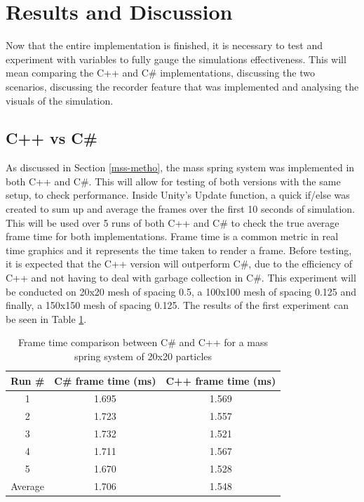 \documentclass[12pt,a4paper]{article}
\begin{document}
\section{Results and Discussion}
Now that the entire implementation is finished, it is necessary to test and experiment with variables to fully gauge the simulations effectiveness. This will mean comparing the C++ and C\# implementations, discussing the two scenarios, discussing the recorder feature that was implemented and analysing the visuals of the simulation.
\subsection{C++ vs C\#}
\label{cppcomp}
As discussed in Section \ref{mss-metho}, the mass spring system was implemented in both C++ and C\#. This will allow for testing of both versions with the same setup, to check performance. Inside Unity's Update function, a quick if/else was created to sum up and average the frames over the first 10 seconds of simulation. This will be used over 5 runs of both C++ and C\# to check the true average frame time for both implementations. Frame time is a common metric in real time graphics and it represents the time taken to render a frame.  Before testing, it is expected that the C++ version will outperform C\#, due to the efficiency of C++ and not having to deal with garbage collection in C\#. This experiment will be conducted on 20x20 mesh of spacing 0.5, a 100x100 mesh of spacing 0.125 and finally, a 150x150 mesh of spacing 0.125. The results of the first experiment can be seen in Table \ref{tab:lang}. \\
\begin{table}[htbp]
	\centering
	\begin{tabular}{|c|c|c|} %
		\hline %
		Run \# & C\# frame time (ms) & C++ frame time (ms)\\ %
		\hline %
		1 & 1.695 & 1.569 \\ 
		2 & 1.723 & 1.557 \\ 
		3 & 1.732 & 1.521 \\ 
		4 & 1.711 & 1.567  \\ 
		5 & 1.670 & 1.528  \\ 
		\hline
		Average & 1.706 & 1.548 \\ 
		\hline %
	\end{tabular}
	\caption{Frame time comparison between C\# and C++ for a mass spring system of 20x20 particles} %
	\label{tab:lang}
\end{table}
\end{document}
